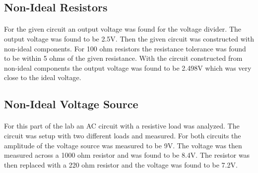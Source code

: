 \documentclass{article}
\begin{document}
\subsection*{Non-Ideal Resistors}
\paragraph{}
For the given circuit an output voltage was found for the voltage divider. The output voltage was found to be 2.5V. Then the given circuit was constructed with 
non-ideal components. For 100 ohm resistors the resistance tolerance was found to be within 5 ohms of the given resistance. With the circuit constructed from
non-ideal components the output voltage was found to be 2.498V which was very close to the ideal voltage.

\subsection*{Non-Ideal Voltage Source}
\paragraph{}
For this part of the lab an AC circuit with a resistive load was analyzed. The circuit was setup with two different loads and measured. For both circuits the 
amplitude of the voltage source was measured to be 9V. The voltage was then measured across a 1000 ohm resistor and was found to be 8.4V. The resistor was then 
replaced with a 220 ohm resistor and the voltage was found to be 7.2V. 
\end{document}
